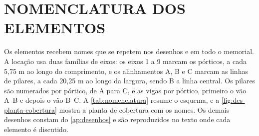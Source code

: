 
\section{NOMENCLATURA DOS ELEMENTOS}\label{sec:nomenclatura}

Os elementos recebem nomes que se repetem nos desenhos e em todo o memorial. A
locação usa duas famílias de eixos: os eixos 1 a 9 marcam os pórticos, a cada
5,75 m ao longo do comprimento, e os alinhamentos A, B e C marcam as linhas de
pilares, a cada 20,25 m ao longo da largura, sendo B a linha central. Os
pilares são numerados por pórtico, de A para C, e as vigas por pórtico, primeiro
o vão A--B e depois o vão B--C. A \autoref{tab:nomenclatura} resume o esquema,
e a \autoref{fig:des-planta-cobertura} mostra a planta de cobertura com os
nomes. Os demais desenhos constam do \autoref{ap:desenhos} e são reproduzidos no
texto onde cada elemento é discutido.

